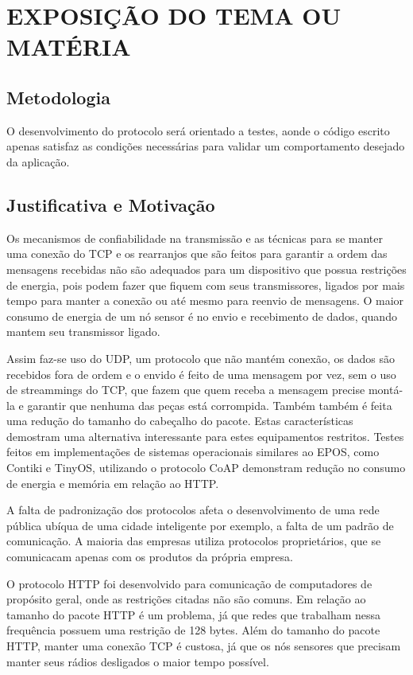 \section{EXPOSIÇÃO DO TEMA OU MATÉRIA}

\subsection{Metodologia}

O desenvolvimento do protocolo será orientado a testes, aonde o código escrito apenas satisfaz as condições necessárias para validar um comportamento desejado da aplicação.

\subsection{Justificativa e Motivação}

Os mecanismos de confiabilidade na transmissão e as técnicas para se manter uma conexão do TCP e os rearranjos que são feitos para garantir a ordem das mensagens recebidas não são adequados para um dispositivo que possua restrições de energia, pois podem fazer que fiquem com seus transmissores, ligados por mais tempo para manter a conexão ou até mesmo para reenvio de mensagens. O maior consumo de energia de um nó sensor é no envio e recebimento de dados, quando mantem seu transmissor ligado.

Assim faz-se uso do UDP, um protocolo que não mantém conexão, os dados são recebidos fora de ordem e o envido é feito de uma mensagem por vez, sem o uso de streammings do TCP, que fazem que quem receba a mensagem precise montá-la e garantir que nenhuma das peças está corrompida. Também também é feita uma redução do tamanho do cabeçalho do pacote. Estas características demostram uma alternativa interessante para estes equipamentos restritos. Testes feitos em implementações de sistemas operacionais similares ao EPOS, como Contiki e TinyOS, utilizando o protocolo CoAP demonstram redução no consumo de energia e memória em relação ao HTTP.

A falta de padronização dos protocolos afeta o desenvolvimento de uma rede pública ubíqua de uma cidade inteligente por exemplo, a falta de um padrão de comunicação. A maioria das empresas utiliza protocolos proprietários, que se comunicacam apenas com os produtos da própria empresa.

O protocolo HTTP foi desenvolvido para comunicação de computadores de propósito geral, onde as restrições citadas não são comuns. Em relação ao tamanho do pacote HTTP é um problema, já que redes que trabalham nessa frequência possuem uma restrição de 128 bytes.  Além do tamanho do pacote HTTP, manter uma conexão TCP é custosa, já que os nós sensores que precisam manter seus rádios desligados o maior tempo possível.

